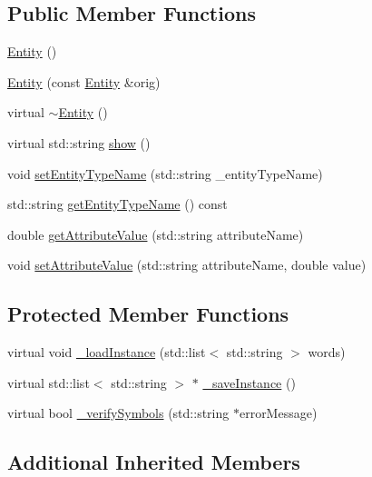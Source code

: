 \subsection*{Public Member Functions}
\begin{DoxyCompactItemize}
\item 
\hyperlink{class_entity_a980f368aa07ce358583982821533a54a}{Entity} ()
\item 
\hyperlink{class_entity_a9de139ff12775dd95fb80bec08247de7}{Entity} (const \hyperlink{class_entity}{Entity} \&orig)
\item 
virtual \hyperlink{class_entity_adf6d3f7cb1b2ba029b6b048a395cc8ae}{$\sim$\-Entity} ()
\item 
virtual std\-::string \hyperlink{class_entity_a86cc324050b451b31b134943e7978e36}{show} ()
\item 
void \hyperlink{class_entity_a40053760a2c84dd72fd5aeb425f6781d}{set\-Entity\-Type\-Name} (std\-::string \-\_\-entity\-Type\-Name)
\item 
std\-::string \hyperlink{class_entity_a860a6385aa2af6b8d205a8e3ea912c38}{get\-Entity\-Type\-Name} () const 
\item 
double \hyperlink{class_entity_aed93eae1f252705e713dd7f8019ace35}{get\-Attribute\-Value} (std\-::string attribute\-Name)
\item 
void \hyperlink{class_entity_ad1a2bc190ef151a4a5c7eff902ee468d}{set\-Attribute\-Value} (std\-::string attribute\-Name, double value)
\end{DoxyCompactItemize}
\subsection*{Protected Member Functions}
\begin{DoxyCompactItemize}
\item 
virtual void \hyperlink{class_entity_a51972e626aef5f92a10d5f800e323237}{\-\_\-load\-Instance} (std\-::list$<$ std\-::string $>$ words)
\item 
virtual std\-::list$<$ std\-::string $>$ $\ast$ \hyperlink{class_entity_a1569ba1b09e70e4769c5f02f611a8c61}{\-\_\-save\-Instance} ()
\item 
virtual bool \hyperlink{class_entity_a5a5fc79267b3671839597c99f8630a87}{\-\_\-verify\-Symbols} (std\-::string $\ast$error\-Message)
\end{DoxyCompactItemize}
\subsection*{Additional Inherited Members}


